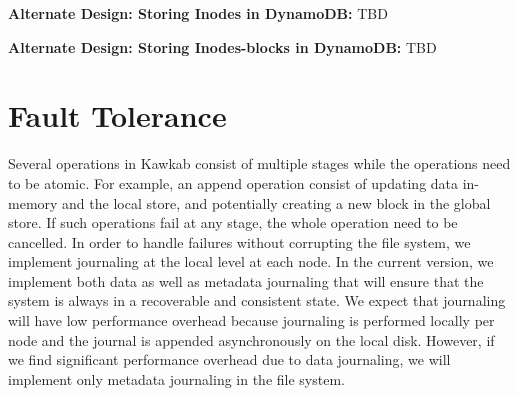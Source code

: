 \documentclass[]{article}
\newcommand{\subtopic}[1]{\vspace{1.5pt} \noindent \textbf{#1}}
\begin{document}
%


\subtopic{Alternate Design: Storing Inodes in DynamoDB:} TBD


\subtopic{Alternate Design: Storing Inodes-blocks in DynamoDB:} TBD

%

%


\section{Fault Tolerance}

Several operations in Kawkab consist of multiple stages while the operations need 
to be atomic. For example, an append operation consist of updating data in-memory and
the local store, and potentially creating a new block in the global store. If such
operations fail at any stage, the whole operation need to be cancelled. In order
to handle failures without corrupting the file system, we implement journaling
at the local level at each node. In the current version, we implement both
data as well as metadata journaling that will ensure that the system is always
in a recoverable and consistent state. We expect that journaling will have low
performance overhead because journaling is performed locally per node and the
journal is appended asynchronously on the local disk. However, if we find significant
performance overhead due to data journaling, we will implement only metadata journaling
in the file system.
\end{document}
